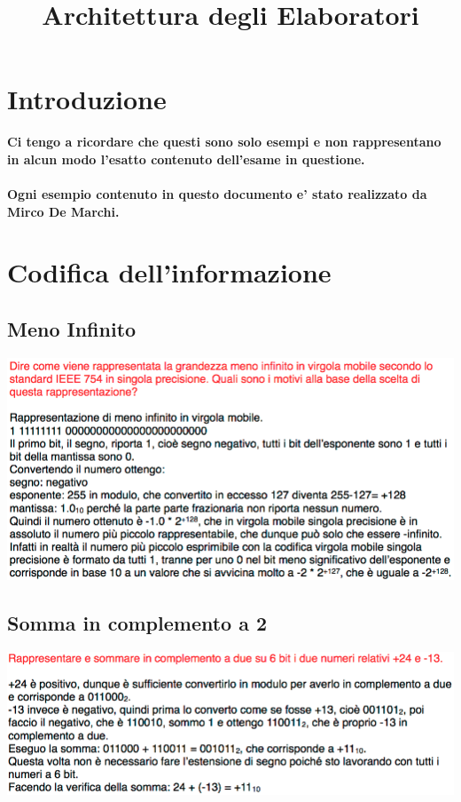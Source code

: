 \documentclass[a4paper, 10pt]{article}
\title{Architettura degli Elaboratori}
\begin{document}
	\maketitle
	
	\section{Introduzione}
		\textbf{Ci tengo a ricordare che questi sono solo esempi e non rappresentano in alcun modo l'esatto contenuto dell'esame in questione.\\ \\ Ogni esempio contenuto in questo documento e' stato realizzato da Mirco De Marchi.}
		
	\section{Codifica dell'informazione}
		\subsection{Meno Infinito}
			\includegraphics[width=\textwidth]{meno_infinito.png}
			
		\subsection{Somma in complemento a 2}
			\includegraphics[width=\textwidth]{somma_complemento.png}
			
\end{document}
